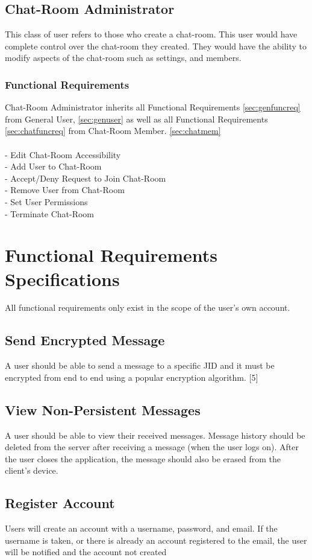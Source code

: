 \documentclass[11pt]{article}
\theoremstyle{plain}
\theoremstyle{definition}
\begin{document}
\subsection{Chat-Room Administrator}\label{sec:chatadmin}
This class of user refers to those who create a chat-room. This user would have complete control over the chat-room they created. They would have the ability to modify aspects of the chat-room such as settings, and members.
\subsubsection{Functional Requirements}
Chat-Room Administrator inherits all Functional Requirements \ref{sec:genfuncreq} from General User, \ref{sec:genuser} as well as all Functional Requirements \ref{sec:chatfuncreq} from Chat-Room Member. \ref{sec:chatmem}\\\\
- Edit Chat-Room Accessibility\\
- Add User to Chat-Room\\
- Accept/Deny Request to Join Chat-Room\\
- Remove User from Chat-Room\\
- Set User Permissions\\
- Terminate Chat-Room

\section{Functional Requirements Specifications}\label{sec:funcrequirements}
All functional requirements only exist in the scope of the user's own account.
\subsection{Send Encrypted Message}
A user should be able to send a message to a specific JID and it must be encrypted from end to end using a popular encryption algorithm. [5]
\subsection{View Non-Persistent Messages}
A user should be able to view their received messages. Message history should be deleted from the server after receiving a message (when the user logs on). After the user closes the application, the message should also be erased from the client's device.
\subsection{Register Account}
Users will create an account with a username, password, and email. If the username is taken, or there is already an account registered to the email, the user will be notified and the account not created
\end{document}
